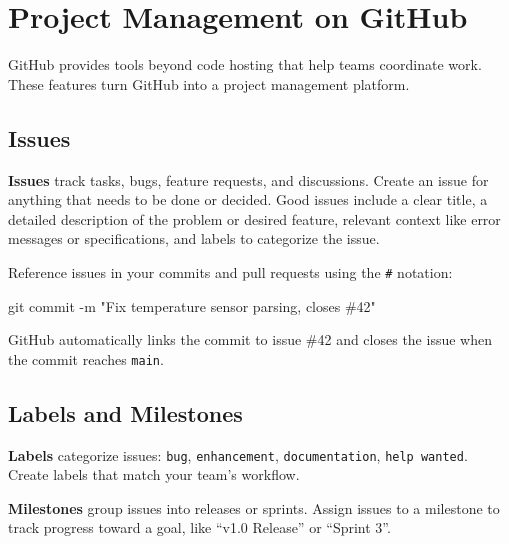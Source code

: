 \documentclass[
  letterpaper,
  DIV=11,
  numbers=noendperiod]{scrreprt}
\newenvironment{Shaded}{\begin{snugshade}}{\end{snugshade}}
\newcommand{\AttributeTok}[1]{\textcolor[rgb]{0.40,0.45,0.13}{#1}}
\newcommand{\FunctionTok}[1]{\textcolor[rgb]{0.28,0.35,0.67}{#1}}
\newcommand{\NormalTok}[1]{\textcolor[rgb]{0.00,0.23,0.31}{#1}}
\newcommand{\StringTok}[1]{\textcolor[rgb]{0.13,0.47,0.30}{#1}}
\begin{document}
\section{Project Management on
GitHub}\label{project-management-on-github}

GitHub provides tools beyond code hosting that help teams coordinate
work. These features turn GitHub into a project management platform.

\subsection{Issues}\label{issues}

\textbf{Issues} track tasks, bugs, feature requests, and discussions.
Create an issue for anything that needs to be done or decided. Good
issues include a clear title, a detailed description of the problem or
desired feature, relevant context like error messages or specifications,
and labels to categorize the issue.

Reference issues in your commits and pull requests using the \texttt{\#}
notation:

\begin{codelisting}

\caption{\texttt{terminal}}

\begin{Shaded}
\begin{Highlighting}[]
\FunctionTok{git}\NormalTok{ commit }\AttributeTok{{-}m} \StringTok{"Fix temperature sensor parsing, closes \#42"}
\end{Highlighting}
\end{Shaded}

\end{codelisting}

GitHub automatically links the commit to issue \#42 and closes the issue
when the commit reaches \texttt{main}.

\subsection{Labels and Milestones}\label{labels-and-milestones}

\textbf{Labels} categorize issues: \texttt{bug}, \texttt{enhancement},
\texttt{documentation}, \texttt{help\ wanted}. Create labels that match
your team's workflow.

\textbf{Milestones} group issues into releases or sprints. Assign issues
to a milestone to track progress toward a goal, like ``v1.0 Release'' or
``Sprint 3''.
\end{document}
